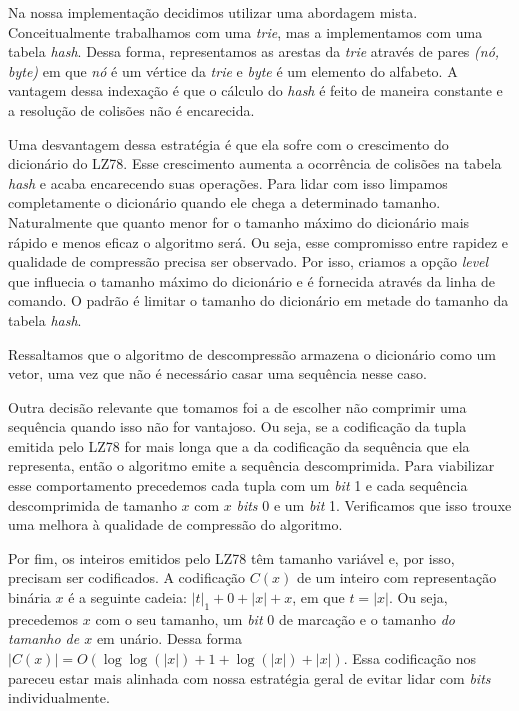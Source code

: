 \documentclass[]{article}
\begin{document}
Na nossa implementação decidimos utilizar uma abordagem mista. Conceitualmente trabalhamos com uma \textit{trie}, mas a implementamos com uma tabela \textit{hash}. Dessa forma, representamos as arestas da \textit{trie} através de pares \textit{(nó, byte)} em que \textit{nó} é um vértice da \textit{trie} e \textit{byte} é um elemento do alfabeto. A vantagem dessa indexação é que o cálculo do \textit{hash} é feito de maneira constante e a resolução de colisões não é encarecida.

Uma desvantagem dessa estratégia é que ela sofre com o crescimento do dicionário do LZ78. Esse crescimento aumenta a ocorrência de colisões na tabela \textit{hash} e acaba encarecendo suas operações. Para lidar com isso limpamos completamente o dicionário quando ele chega a determinado tamanho. Naturalmente que quanto menor for o tamanho máximo do dicionário mais rápido e menos eficaz o algoritmo será. Ou seja, esse compromisso entre rapidez e qualidade de compressão precisa ser observado. Por isso, criamos a opção \textit{level} que influecia o tamanho máximo do dicionário e é fornecida através da linha de comando. O padrão é limitar o tamanho do dicionário em metade do tamanho da tabela \textit{hash}.

Ressaltamos que o algoritmo de descompressão armazena o dicionário como um vetor, uma vez que não é necessário casar uma sequência nesse caso.

Outra decisão relevante que tomamos foi a de escolher não comprimir uma sequência quando isso não for vantajoso. Ou seja, se a codificação da tupla emitida pelo LZ78 for mais longa que a da codificação da sequência que ela representa, então o algoritmo emite a sequência descomprimida. Para viabilizar esse comportamento precedemos cada tupla com um \textit{bit} 1 e cada sequência descomprimida de tamanho $x$ com $x$ \textit{bits} 0 e um \textit{bit} 1. Verificamos que isso trouxe uma melhora à qualidade de compressão do algoritmo.

Por fim, os inteiros emitidos pelo LZ78 têm tamanho variável e, por isso, precisam ser codificados. A codificação $C(x)$ de um inteiro com representação binária $x$ é a seguinte cadeia: $|t|_1 + 0 + |x| + x$, em que $t = |x|$. Ou seja, precedemos $x$ com o seu tamanho, um \textit{bit} 0 de marcação e o tamanho \textit{do tamanho de $x$} em unário. Dessa forma $|C(x)| = O(\log\log(|x|) + 1 + \log(|x|) + |x|)$. Essa codificação nos pareceu estar mais alinhada com nossa estratégia geral de evitar lidar com \textit{bits} individualmente.
\end{document}

